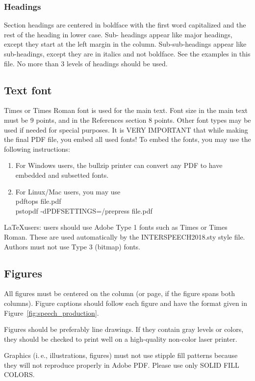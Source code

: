 \documentclass[a4paper]{article}
\begin{document}
\subsubsection{Headings}
Section headings are centered in boldface with the first word capitalized and the rest of the heading in lower case. Sub- headings appear like major headings, except they start at the left margin in the column. Sub-sub-headings appear like sub-headings, except they are in italics and not boldface. See the examples in this file. No more than 3 levels of headings should be used.

\subsection{Text font}

Times or Times Roman font is used for the main text. Font size in the main text must be 9 points, and in the References section 8 points. Other font types may be used if needed for special purposes. It is VERY IMPORTANT that while making the final PDF file, you embed all used fonts! To embed the fonts, you may use the following instructions:
\begin{enumerate}
\item For Windows users, the bullzip printer can convert any PDF to have embedded and subsetted fonts.
\item For Linux/Mac users, you may use \\
   pdftops file.pdf\\
   pstopdf -dPDFSETTINGS=/prepress file.pdf
\end{enumerate}

\LaTeX users: users should use Adobe Type 1 fonts such as Times or Times Roman. These are used automatically by the INTERSPEECH2018.sty style file. Authors must not use Type 3 (bitmap) fonts.

\subsection{Figures}

All figures must be centered on the column (or page, if the figure spans both columns). Figure captions should follow each figure and have the format given in Figure~\ref{fig:speech_production}.

Figures should be preferably line drawings. If they contain gray levels or colors, they should be checked to print well on a high-quality non-color laser printer.

Graphics (i.\,e., illustrations, figures) must not use stipple fill patterns because they will not reproduce properly in Adobe PDF. Please use only SOLID FILL COLORS.
\end{document}
